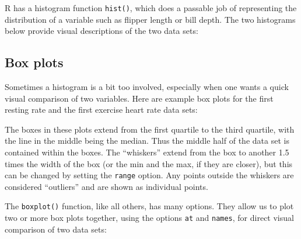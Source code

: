\documentclass[
  letterpaper,
  DIV=11,
  numbers=noendperiod]{scrreprt}
\newenvironment{Shaded}{\begin{snugshade}}{\end{snugshade}}
\newcommand{\NormalTok}[1]{\textcolor[rgb]{0.00,0.23,0.31}{#1}}
\begin{document}
R has a histogram function \texttt{hist()}, which does a passable job of
representing the distribution of a variable such as flipper length or
bill depth. The two histograms below provide visual descriptions of the
two data sets:

\begin{Shaded}
\end{Shaded}

\hypertarget{box-plots}{%
\subsection*{Box plots}\label{box-plots}}

Sometimes a histogram is a bit too involved, especially when one wants a
quick visual comparison of two variables. Here are example box plots for
the first resting rate and the first exercise heart rate data sets:

\begin{Shaded}
\end{Shaded}

The boxes in these plots extend from the first quartile to the third
quartile, with the line in the middle being the median. Thus the middle
half of the data set is contained within the boxes. The ``whiskers''
extend from the box to another 1.5 times the width of the box (or the
min and the max, if they are closer), but this can be changed by setting
the \texttt{range} option. Any points outside the whiskers are
considered ``outliers'' and are shown as individual points.

The \texttt{boxplot()} function, like all others, has many options. They
allow us to plot two or more box plots together, using the options
\texttt{at} and \texttt{names}, for direct visual comparison of two data
sets:
\end{document}
